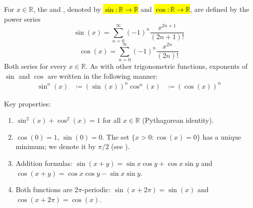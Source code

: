 \begin{definition} \label{definition:sine_and_cosine_functions_on_real_line_via_power_series}
For $x \in \mathbb{R}$, the  and , denoted by \hl{$\sin : \mathbb{R} \to \mathbb{R}$} and \hl{$\cos : \mathbb{R} \to \mathbb{R}$}, are defined by the power series
$$\sin(x) = \sum_{n=0}^\infty (-1)^n \frac{x^{2n+1}}{(2n+1)!}$$
$$\cos(x) = \sum_{n=0}^\infty (-1)^n \frac{x^{2n}}{(2n)!}$$
Both series  for every $x \in \mathbb{R}$. As with other trigonometric functions, exponents of $\sin$ and $\cos$ are written in the following manner:
\begin{align*}
    \sin^n(x) &\coloneq (\sin(x))^n
    \cos^n(x) &\coloneq (\cos(x))^n
\end{align*}

Key properties:
\begin{enumerate}
    \item $\sin^2(x) + \cos^2(x) = 1$ for all $x \in \mathbb{R}$ (Pythagorean identity).
    \item $\cos(0) = 1$, $\sin(0) = 0$. The set $\{x > 0 : \cos(x) = 0\}$ has a unique minimum; we denote it by $\pi/2$ (see ).
    \item Addition formulas: $\sin(x+y) = \sin x \cos y + \cos x \sin y$ and $\cos(x+y) = \cos x \cos y - \sin x \sin y$.
    \item Both functions are $2\pi$-periodic: $\sin(x + 2\pi) = \sin(x)$ and $\cos(x + 2\pi) = \cos(x)$.
\end{enumerate}
\end{definition}
